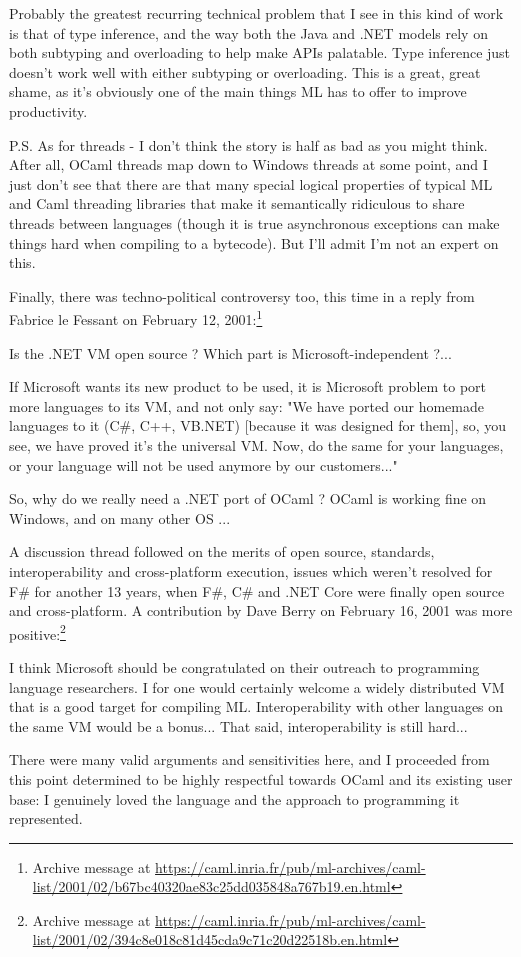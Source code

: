 \documentclass[acmsmall,review]{acmart}\settopmatter{printfolios=true,printccs=false,printacmref=false}
\begin{document}
\begin{verbquote}
Probably the greatest recurring technical problem that I see in this kind of work is that of type inference, and the way both the Java and .NET models rely on both subtyping and overloading to help make APIs palatable.  Type inference just doesn't work well with either subtyping or overloading.  This is a great, great shame, as it's obviously one of the main things ML has to offer to improve productivity.  

P.S. As for threads - I don't think the story is half as bad as you might think.  After all, OCaml threads map down to Windows threads at some point, and I just don't see that there are that many special logical properties of typical ML and Caml threading libraries that make it semantically ridiculous to share threads between languages (though it is true asynchronous exceptions can make things hard when compiling to a bytecode).  But I'll admit I'm not an expert on this. 
\end{verbquote}
Finally, there was techno-political controversy too, this time in a reply from Fabrice le Fessant on February 12, 2001:\footnote{Archive message at \url{https://caml.inria.fr/pub/ml-archives/caml-list/2001/02/b67bc40320ae83c25dd035848a767b19.en.html}}
\begin{verbquote}
Is the .NET VM open source ? Which part is Microsoft-independent ?...

If Microsoft wants its new product to be used, it is Microsoft problem to port more languages to its VM, and not only say: "We have ported our homemade languages to it (C\#, C++, VB.NET) [because it was designed for them], so, you see, we have proved it's the universal VM. Now, do the same for your languages, or your language will not be used anymore by our customers..."

So, why do we really need a .NET port of OCaml ? OCaml is working fine on Windows, and on many other OS ... 
\end{verbquote}
A discussion thread followed on the merits of open source, standards, interoperability and cross-platform execution, issues which weren’t resolved for F\# for another 13 years, when F\#, C\# and .NET Core were finally open source and cross-platform.  A contribution by Dave Berry on February 16, 2001 was more positive:\footnote{Archive message at \url{https://caml.inria.fr/pub/ml-archives/caml-list/2001/02/394c8e018c81d45cda9c71c20d22518b.en.html}}
\begin{verbquote}
I think Microsoft should be congratulated on their outreach to programming language researchers.  I for one would certainly welcome a widely distributed VM that is a good target for compiling ML.  Interoperability with other languages on the same VM would be a bonus... That said, interoperability is still hard...
\end{verbquote}
There were many valid arguments and sensitivities here, and I proceeded from this point determined to be highly respectful towards OCaml and its existing user base: I genuinely loved the language and the approach to programming it represented. 
\end{document}
